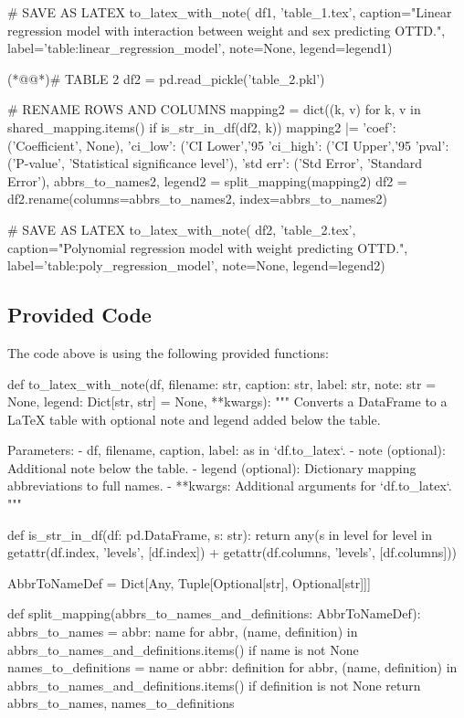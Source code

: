 \documentclass[11pt]{article}
\begin{document}
\begin{python}
# SAVE AS LATEX
to_latex_with_note(
    df1, 'table_1.tex',
    caption="Linear regression model with interaction between weight and sex predicting OTTD.",
    label='table:linear_regression_model',
    note=None,
    legend=legend1)


(*@@*)# TABLE 2
df2 = pd.read_pickle('table_2.pkl')

# RENAME ROWS AND COLUMNS
mapping2 = dict((k, v) for k, v in shared_mapping.items() if is_str_in_df(df2, k)) 
mapping2 |= {
    'coef': ('Coefficient', None),
    'ci_low': ('CI Lower','95%
    'ci_high': ('CI Upper','95%
    'pval': ('P-value', 'Statistical significance level'),
    'std err': ('Std Error', 'Standard Error'),
}
abbrs_to_names2, legend2 = split_mapping(mapping2)
df2 = df2.rename(columns=abbrs_to_names2, index=abbrs_to_names2)

# SAVE AS LATEX
to_latex_with_note(
    df2, 'table_2.tex',
    caption="Polynomial regression model with weight predicting OTTD.",
    label='table:poly_regression_model',
    note=None,
    legend=legend2)

\end{python}

\subsection{Provided Code}
The code above is using the following provided functions:

\begin{python}
def to_latex_with_note(df, filename: str, caption: str, label: str, note: str = None, legend: Dict[str, str] = None, **kwargs):
    """
    Converts a DataFrame to a LaTeX table with optional note and legend added below the table.

    Parameters:
    - df, filename, caption, label: as in `df.to_latex`.
    - note (optional): Additional note below the table.
    - legend (optional): Dictionary mapping abbreviations to full names.
    - **kwargs: Additional arguments for `df.to_latex`.
    """

def is_str_in_df(df: pd.DataFrame, s: str):
    return any(s in level for level in getattr(df.index, 'levels', [df.index]) + getattr(df.columns, 'levels', [df.columns]))

AbbrToNameDef = Dict[Any, Tuple[Optional[str], Optional[str]]]

def split_mapping(abbrs_to_names_and_definitions: AbbrToNameDef):
    abbrs_to_names = {abbr: name for abbr, (name, definition) in abbrs_to_names_and_definitions.items() if name is not None}
    names_to_definitions = {name or abbr: definition for abbr, (name, definition) in abbrs_to_names_and_definitions.items() if definition is not None}
    return abbrs_to_names, names_to_definitions

\end{python}
\end{document}
